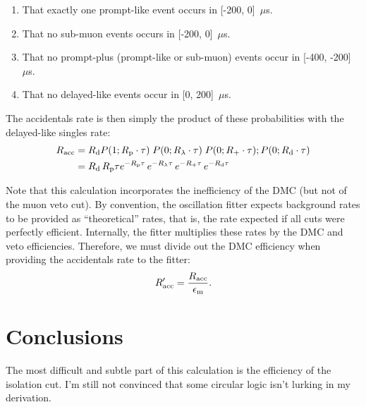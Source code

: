 \documentclass[../thesis.tex]{subfiles}
\begin{document}
\begin{enumerate}
\item That exactly one prompt-like event occurs in [-200, 0]~$\mu$s.
\item That no sub-muon events occurs in [-200, 0]~$\mu$s.
\item That no prompt-plus (prompt-like or sub-muon) events occur in [-400, -200]~$\mu$s.
\item That no delayed-like events occur in [0, 200]~$\mu$s.
\end{enumerate}

\def\Racc{\ensuremath{R_\mathrm{acc}}}

The accidentals rate is then simply the product of these probabilities with the delayed-like singles rate:
\begin{align}
  \Racc &= \Rdel P(1; \Rpro \cdot \tau)\;P(0; \Rsub \cdot \tau)\;P(0; \Rplu \cdot \tau);P(0; \Rdel \cdot \tau) \nonumber \\
        &= \Rdel\,\Rpro\tau e^{-\Rpro\tau}\,e^{-\Rsub\tau}\,e^{-\Rplu\tau}\,e^{-\Rdel\tau}
\end{align}

Note that this calculation incorporates the inefficiency of the DMC (but not of the muon veto cut). By convention, the oscillation fitter expects background rates to be provided as ``theoretical'' rates, that is, the rate expected if all cuts were perfectly efficient. Internally, the fitter multiplies these rates by the DMC and veto efficiencies. Therefore, we must divide out the DMC efficiency when providing the accidentals rate to the fitter:
\begin{equation}
  \Racc' = \frac{\Racc}{\edmc}.
\end{equation}

\section{Conclusions}
\label{sec:accdmcconcl}

The most difficult and subtle part of this calculation is the efficiency of the isolation cut. I'm still not convinced that some circular logic isn't lurking in my derivation.
\end{document}
